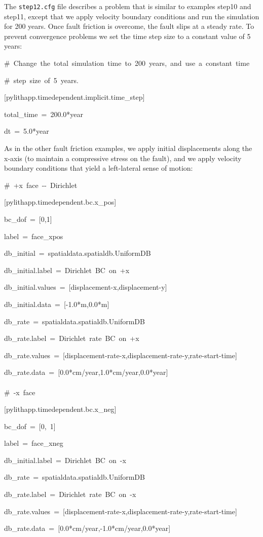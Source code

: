 The \texttt{step12.cfg} file describes a problem that is similar to
examples step10 and step11, except that we apply velocity boundary
conditions and run the simulation for 200 years. Once fault friction
is overcome, the fault slips at a steady rate. To prevent convergence
problems we set the time step size to a constant value of 5 years:
\begin{lyxcode}
\#~Change~the~total~simulation~time~to~200~years,~and~use~a~constant~time

\#~step~size~of~5~years.

{[}pylithapp.timedependent.implicit.time\_step{]}

total\_time~=~200.0{*}year

dt~=~5.0{*}year
\end{lyxcode}
As in the other fault friction examples, we apply initial displacements
along the x-axis (to maintain a compressive stress on the fault),
and we apply velocity boundary conditions that yield a left-lateral
sense of motion:
\begin{lyxcode}
\#~+x~face~-{}-~Dirichlet

{[}pylithapp.timedependent.bc.x\_pos{]}

bc\_dof~=~{[}0,1{]}

label~=~face\_xpos

db\_initial~=~spatialdata.spatialdb.UniformDB

db\_initial.label~=~Dirichlet~BC~on~+x

db\_initial.values~=~{[}displacement-x,displacement-y{]}

db\_initial.data~=~{[}-1.0{*}m,0.0{*}m{]}

db\_rate~=~spatialdata.spatialdb.UniformDB

db\_rate.label~=~Dirichlet~rate~BC~on~+x

db\_rate.values~=~{[}displacement-rate-x,displacement-rate-y,rate-start-time{]}

db\_rate.data~=~{[}0.0{*}cm/year,1.0{*}cm/year,0.0{*}year{]}~\\
~\\


\#~-x~face

{[}pylithapp.timedependent.bc.x\_neg{]}

bc\_dof~=~{[}0,~1{]}

label~=~face\_xneg

db\_initial.label~=~Dirichlet~BC~on~-x

db\_rate~=~spatialdata.spatialdb.UniformDB

db\_rate.label~=~Dirichlet~rate~BC~on~-x

db\_rate.values~=~{[}displacement-rate-x,displacement-rate-y,rate-start-time{]}

db\_rate.data~=~{[}0.0{*}cm/year,-1.0{*}cm/year,0.0{*}year{]}
\end{lyxcode}
